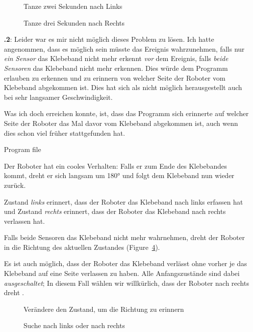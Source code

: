 \documentclass[12pt,a4paper]{article}
\begin{document}
\begin{figure}
\begin{center}
\caption{Tanze zwei Sekunden nach Links}
\label{fig.dance-left}
\end{center}
\end{figure}

\begin{figure}
\begin{center}
\caption{Tanze drei Sekunden nach Rechts}
\label{fig.dance-right}
\end{center}
\end{figure}

\textbf{\thesection.2}:
Leider war es mir nicht möglich dieses Problem zu lösen. Ich hatte angenommen, dass es möglich sein müsste das Ereignis wahrzunehmen, falls nur  \emph{ein Sensor} das Klebeband nicht mehr erkennt \emph{vor} dem Ereignis, falls \emph{beide Sensoren} das Klebeband nicht mehr erkennen. Dies würde dem Programm erlauben zu erkennen und zu erinnern von welcher Seite der Roboter vom Klebeband abgekommen ist. Dies hat sich als nicht möglich herausgestellt auch bei sehr langsamer Geschwindigkeit. 

Was ich doch erreichen konnte, ist, dass das Programm sich erinnerte auf welcher Seite der Roboter das Mal davor vom Klebeband abgekommen ist, auch wenn dies schon viel früher stattgefunden hat.

{\raggedleft \hfill Program file }

Der Roboter hat ein cooles Verhalten: Falls er zum Ende des Klebebandes kommt, dreht er sich langsam um 180° und folgt dem Klebeband nun wieder zurück.

Zustand \emph{links}  erinnert, dass der Roboter das Klebeband nach links erfassen hat und Zustand \emph{rechts}  erinnert, dass der Roboter das Klebeband nach rechts verlassen hat.

Falls beide Sensoren das Klebeband nicht mehr wahrnehmen, dreht der Roboter in die Richtung des aktuellen Zustandes (Figure~\ref{fig.follow1}).

Es ist auch möglich, dass der Roboter das Klebeband verlässt ohne vorher je das Klebeband auf eine Seite verlassen zu haben. Alle Anfangszustände sind dabei \emph{ausgeschaltet}; In diesem Fall wählen wir willkürlich, dass der Roboter nach rechts dreht  .

\begin{figure}
\begin{center}
\caption{Verändere den Zustand, um die Richtung zu erinnern}
\label{fig.follow3}
\end{center}
\end{figure}

\begin{figure}
\begin{center}
\caption{Suche nach links oder nach rechts}
\label{fig.follow1}
\end{center}
\end{figure}
\end{document}
